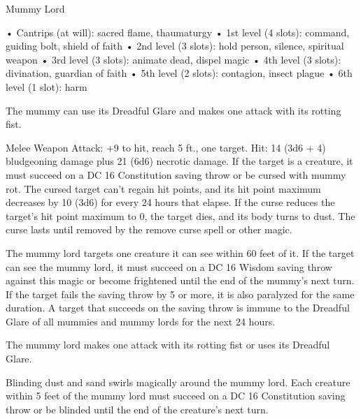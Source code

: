 \begin{monsterbox}{Mummy Lord}
\begin{monsteraction}[Spellcasting]
• Cantrips (at will): sacred flame, thaumaturgy
• 1st level (4 slots): command, guiding bolt, shield of faith
• 2nd level (3 slots): hold person, silence, spiritual weapon
• 3rd level (3 slots): animate dead, dispel magic
• 4th level (3 slots): divination, guardian of faith
• 5th level (2 slots): contagion, insect plague
• 6th level (1 slot): harm
\end{monsteraction}
\begin{monsteraction}[Multiattack]
The mummy can use its Dreadful Glare and makes one attack with its rotting fist.
\end{monsteraction}
\begin{monsteraction}
Melee Weapon Attack: +9 to hit, reach 5 ft., one target. Hit: 14 (3d6 + 4) bludgeoning damage plus 21 (6d6) necrotic damage. If the target is a creature, it must succeed on a DC 16 Constitution saving throw or be cursed with mummy rot. The cursed target can't regain hit points, and its hit point maximum decreases by 10 (3d6) for every 24 hours that elapse. If the curse reduces the target's hit point maximum to 0, the target dies, and its body turns to dust. The curse lasts until removed by the remove curse spell or other magic.
\end{monsteraction}
\begin{monsteraction}
The mummy lord targets one creature it can see within 60 feet of it. If the target can see the mummy lord, it must succeed on a DC 16 Wisdom saving throw against this magic or become frightened until the end of the mummy's next turn. If the target fails the saving throw by 5 or more, it is also paralyzed for the same duration. A target that succeeds on the saving throw is immune to the Dreadful Glare of all mummies and mummy lords for the next 24 hours.
\end{monsteraction}
\begin{monsteraction}[Attack]
The mummy lord makes one attack with its rotting fist or uses its Dreadful Glare.
\end{monsteraction}
\begin{monsteraction}
Blinding dust and sand swirls magically around the mummy lord. Each creature within 5 feet of the mummy lord must succeed on a DC 16 Constitution saving throw or be blinded until the end of the creature's next turn.
\end{monsteraction}
\begin{monsteraction}

\end{monsteraction}
\end{monsterbox}
